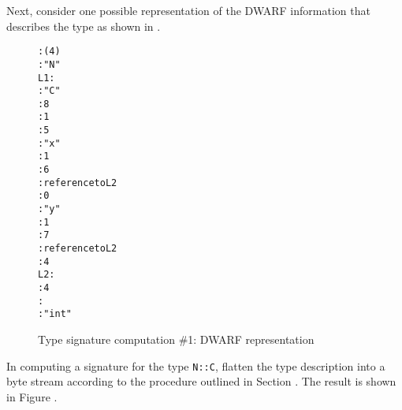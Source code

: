 Next, consider one possible representation of the DWARF
information that describes the type  as shown
in 
.

\begin{figure}
\begin{dwflisting}
\begin{alltt}
  \DWTAGtypeunit
      \DWATlanguage : \DWLANGCplusplus (4)
    \DWTAGnamespace
        \DWATname : "N"
L1:
      \DWTAGstructuretype
          \DWATname : "C"
          \DWATbytesize : 8
          \DWATdeclfile : 1
          \DWATdeclline : 5
        \DWTAGmember
            \DWATname : "x"
            \DWATdeclfile : 1
            \DWATdeclline : 6
            \DWATtype : reference to L2
            \DWATdatamemberlocation : 0
        \DWTAGmember
            \DWATname : "y"
            \DWATdeclfile : 1
            \DWATdeclline : 7
            \DWATtype : reference to L2
            \DWATdatamemberlocation : 4
L2:
     \DWTAGbasetype
         \DWATbytesize : 4
         \DWATencoding : \DWATEsigned
         \DWATname : "int"
\end{alltt}
\end{dwflisting}
\caption{Type signature computation \#1: DWARF representation}
\label{fig:typesignaturecomputation1dwarfrepresentation}
\end{figure}

In computing a signature for the type \texttt{N::C}, flatten the type
description into a byte stream according to the procedure
outlined in 
Section .
The result is shown in 
Figure .

